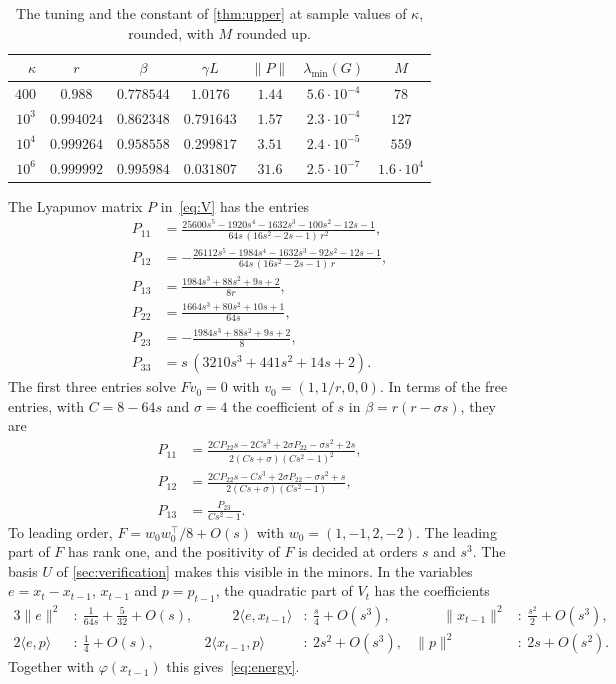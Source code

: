\documentclass[11pt, a4paper]{article}
\theoremstyle{definition}
\begin{document}
\begin{table}[ht]
  \centering
  \caption{The tuning and the constant of \cref{thm:upper} at sample values of $\kappa$, rounded, with $M$ rounded
    up.}
  \label{tab:Mconst}
  \small
  \begin{tabular}{rcccccc}
    \toprule
    $\kappa$ & $r$ & $\beta$ & $\gamma L$ & $\|P\|$ & $\lambda_{\min}(G)$ & $M$ \\
    \midrule
    $400$ & $0.988$ & $0.778544$ & $1.0176$ & $1.44$ & $5.6\cdot10^{-4}$ & $78$ \\
    $10^3$ & $0.994024$ & $0.862348$ & $0.791643$ & $1.57$ & $2.3\cdot10^{-4}$ & $127$ \\
    $10^4$ & $0.999264$ & $0.958558$ & $0.299817$ & $3.51$ & $2.4\cdot10^{-5}$ & $559$ \\
    $10^6$ & $0.999992$ & $0.995984$ & $0.031807$ & $31.6$ & $2.5\cdot10^{-7}$ & $1.6\cdot10^4$ \\
    \bottomrule
  \end{tabular}
\end{table}

The Lyapunov matrix $P$ in~\eqref{eq:V} has the entries
\begin{align*}
  P_{11}&=\frac{25600s^5-1920s^4-1632s^3-100s^2-12s-1}{64s\,(16s^2-2s-1)\,r^2},\\
  P_{12}&=-\frac{26112s^5-1984s^4-1632s^3-92s^2-12s-1}{64s\,(16s^2-2s-1)\,r},\\
  P_{13}&=\frac{1984s^3+88s^2+9s+2}{8r},\\
  P_{22}&=\frac{1664s^3+80s^2+10s+1}{64s},\\
  P_{23}&=-\frac{1984s^3+88s^2+9s+2}{8},\\
  P_{33}&=s\,(3210s^3+441s^2+14s+2).
\end{align*}
The first three entries solve $Fv_0=0$ with $v_0=(1,1/r,0,0)$. In terms of the free entries, with $C=8-64s$ and
$\sigma=4$ the coefficient of $s$ in $\beta=r(r-\sigma s)$, they are
\begin{align*}
  P_{11}&=\frac{2CP_{22}s-2Cs^3+2\sigma P_{22}-\sigma s^2+2s}{2(Cs+\sigma)(Cs^2-1)^2},\\
  P_{12}&=\frac{2CP_{22}s-Cs^3+2\sigma P_{22}-\sigma s^2+s}{2(Cs+\sigma)(Cs^2-1)},\\
  P_{13}&=\frac{P_{23}}{Cs^2-1}.
\end{align*}
To leading order, $F=w_0w_0^\top/8+O(s)$ with $w_0=(1,-1,2,-2)$. The leading part of $F$ has rank one, and the positivity of
$F$ is decided at orders $s$ and $s^3$. The basis $U$ of \cref{sec:verification} makes this visible in the minors. In the
variables $e=x_t-x_{t-1}$, $x_{t-1}$ and $p=p_{t-1}$, the quadratic part of $V_t$ has the coefficients
\begin{alignat*}{3}
  \|e\|^2&:\ \frac1{64s}+\frac5{32}+O(s),&\qquad 2\langle e,x_{t-1}\rangle&:\ \frac s4+O(s^3),&\qquad
  \|x_{t-1}\|^2&:\ \frac{s^2}2+O(s^3),\\
  2\langle e,p\rangle&:\ \frac14+O(s),& 2\langle x_{t-1},p\rangle&:\ 2s^2+O(s^3),& \|p\|^2&:\ 2s+O(s^2).
\end{alignat*}
Together with $\varphi(x_{t-1})$ this gives~\eqref{eq:energy}.
\end{document}
